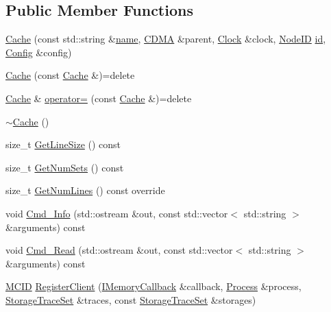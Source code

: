 \subsection*{Public Member Functions}
\begin{DoxyCompactItemize}
\item 
\hyperlink{class_simulator_1_1_c_d_m_a_1_1_cache_a5a158eeca856232d2367fb0754734f71}{Cache} (const std\+::string \&\hyperlink{mtconf_8c_a8f8f80d37794cde9472343e4487ba3eb}{name}, \hyperlink{class_simulator_1_1_c_d_m_a}{C\+D\+M\+A} \&parent, \hyperlink{class_simulator_1_1_clock}{Clock} \&clock, \hyperlink{class_simulator_1_1_c_d_m_a_a59272166fd32e642f3113c22cc756927}{Node\+I\+D} \hyperlink{mtconf_8c_aa3185401f04d30bd505daebf48c39cc5}{id}, \hyperlink{class_config}{Config} \&config)
\item 
\hyperlink{class_simulator_1_1_c_d_m_a_1_1_cache_a7e1019f2b4c8bee29806e078f8aab632}{Cache} (const \hyperlink{class_simulator_1_1_c_d_m_a_1_1_cache}{Cache} \&)=delete
\item 
\hyperlink{class_simulator_1_1_c_d_m_a_1_1_cache}{Cache} \& \hyperlink{class_simulator_1_1_c_d_m_a_1_1_cache_a04f16cef996981468b8b47d345a00dbd}{operator=} (const \hyperlink{class_simulator_1_1_c_d_m_a_1_1_cache}{Cache} \&)=delete
\item 
\hyperlink{class_simulator_1_1_c_d_m_a_1_1_cache_aaca97d16ef71b7baeb5fea8cc6091243}{$\sim$\+Cache} ()
\item 
size\+\_\+t \hyperlink{class_simulator_1_1_c_d_m_a_1_1_cache_a083dc858d3af211893fb8a431a80a8ab}{Get\+Line\+Size} () const 
\item 
size\+\_\+t \hyperlink{class_simulator_1_1_c_d_m_a_1_1_cache_a35617b5599a8bc7b9a2a0bd51b8da103}{Get\+Num\+Sets} () const 
\item 
size\+\_\+t \hyperlink{class_simulator_1_1_c_d_m_a_1_1_cache_ab5fe6b60bf60cc52243e5e838222600a}{Get\+Num\+Lines} () const override
\item 
void \hyperlink{class_simulator_1_1_c_d_m_a_1_1_cache_ad219d4d522e54f3db7a6b97d02af641e}{Cmd\+\_\+\+Info} (std\+::ostream \&out, const std\+::vector$<$ std\+::string $>$ \&arguments) const 
\item 
void \hyperlink{class_simulator_1_1_c_d_m_a_1_1_cache_ad9d2eda67567029367e148a9515182c1}{Cmd\+\_\+\+Read} (std\+::ostream \&out, const std\+::vector$<$ std\+::string $>$ \&arguments) const 
\item 
\hyperlink{namespace_simulator_a4b5747ff30c62c6373badf3b53b9abf7}{M\+C\+I\+D} \hyperlink{class_simulator_1_1_c_d_m_a_1_1_cache_ada0cb62e9c45f2c4f6872cf29f3b42fb}{Register\+Client} (\hyperlink{class_simulator_1_1_i_memory_callback}{I\+Memory\+Callback} \&callback, \hyperlink{class_simulator_1_1_process}{Process} \&process, \hyperlink{class_simulator_1_1_storage_trace_set}{Storage\+Trace\+Set} \&traces, const \hyperlink{class_simulator_1_1_storage_trace_set}{Storage\+Trace\+Set} \&storages)

\end{DoxyCompactItemize}
